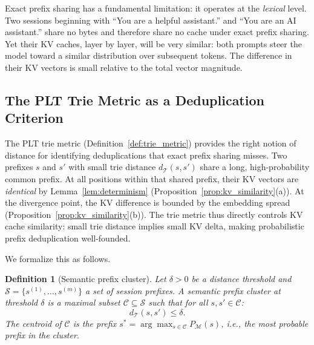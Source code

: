 \documentclass[11pt]{article}
\newtheorem{definition}{Definition}
\begin{document}
Exact prefix sharing has a fundamental limitation: it operates at the
\emph{lexical} level.  Two sessions beginning with ``You are a helpful assistant.''
and ``You are an AI assistant.'' share no bytes and therefore share no cache
under exact prefix sharing.  Yet their KV caches, layer by layer, will be very
similar: both prompts steer the model toward a similar distribution over
subsequent tokens.  The difference in their KV vectors is small relative to
the total vector magnitude.

\subsection{The PLT Trie Metric as a Deduplication Criterion}

The PLT trie metric (Definition~\ref{def:trie_metric}) provides the right
notion of distance for identifying deduplications that exact prefix sharing misses.
Two prefixes $s$ and $s'$ with small trie distance $d_{\mathcal{T}}(s,s')$
share a long, high-probability common prefix.  At all positions within that shared
prefix, their KV vectors are \emph{identical} by Lemma~\ref{lem:determinism}
(Proposition~\ref{prop:kv_similarity}(a)).  At the divergence point, the KV
difference is bounded by the embedding spread (Proposition~\ref{prop:kv_similarity}(b)).
The trie metric thus directly controls KV cache similarity: small trie distance
implies small KV delta, making probabilistic prefix deduplication well-founded.

We formalize this as follows.

\begin{definition}[Semantic prefix cluster]
\label{def:cluster}
Let $\delta > 0$ be a distance threshold and $\mathcal{S} = \{s^{(1)}, \ldots, s^{(m)}\}$
a set of session prefixes.  A \emph{semantic prefix cluster} at threshold $\delta$
is a maximal subset $\mathcal{C} \subseteq \mathcal{S}$ such that for all
$s, s' \in \mathcal{C}$:
\[
  d_{\mathcal{T}}(s, s') \leq \delta.
\]
The \emph{centroid} of $\mathcal{C}$ is the prefix $s^* = \arg\max_{s \in \mathcal{C}} P_{\mathcal{M}}(s)$,
i.e., the most probable prefix in the cluster.
\end{definition}
\end{document}
